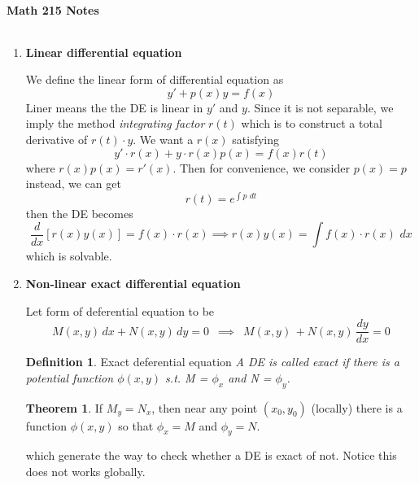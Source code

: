 \documentclass[9pt]{article}
\theoremstyle{definition}
\newtheorem{definition}{Definition}
\newenvironment{changemargin}[2]{%
  \begin{list}{}{%
    \setlength{\topsep}{0pt}%
    \setlength{\leftmargin}{#1}%
    \setlength{\rightmargin}{#2}%
    \setlength{\listparindent}{\parindent}%
    \setlength{\itemindent}{\parindent}%
    \setlength{\parsep}{\parskip}%
  }%
  \item[]}{\end{list}}
\theoremstyle{theorem}
\newtheorem{theorem}{Theorem}
\theoremstyle{remark}
\theoremstyle{lemma}
\begin{document}
\large{\textbf{Math 215 Notes}}


\medskip

\begin{tabular*}{6.5in}{c}
\hline
\end{tabular*}

\bigskip

\begin{changemargin}{-0.125in}{0in}

 \begin{enumerate}
 
	\item \textbf{Linear differential equation}
	
	\medskip
	
	We define the linear form of differential equation as 
	\[
	y' + p(x) y  = f(x)
	\]
    Liner means the the DE is linear in $y'$ and $y$. Since it is not separable, we imply the method \textit{integrating factor} $r(t)$ which is to construct a total derivative of $r(t)\cdot y$. We want a $r(x)$ satisfying 
    \[
    y' \cdot r(x) + y\cdot r(x)p(x) = f(x)r(t)
    \]
    where $r(x)p(x) = r'(x)$. Then for convenience, we consider $p(x) = p$ instead, we can get 
    \[
    r(t) = e^{\int p \,\,dt}
    \]
    then the DE becomes 
    \[
    \frac{d}{dx} [r(x)y(x)] = f(x)\cdot r(x) \implies r(x)y(x) = \int  f(x)\cdot r(x)\,\,dx
    \]
    which is solvable.
    
    \medskip
    
    
     
     \item \textbf{Non-linear exact differential equation}
     
     \medskip
     
     
     Let form of deferential equation to be 
     \[
     M(x,y) \, dx + N(x,y)\, dy = 0 \,\,\,\implies\,\,\, M(x,y)\, + N(x,y)\, \frac{dy}{dx}= 0 
     \]
    \theoremstyle{definition}
    \begin{definition}{Exact deferential equation} \textit{A DE is called \textit{exact} if there is a potential function $\phi(x,y)$ s.t. M = $\phi_x$ and N = $\phi_y$.}
    \end{definition}
    
    \medskip
    
    \theoremstyle{theorem}
    \begin{theorem}
     If $M_y = N_x$, then near any point $(x_0,y_0)$ (locally) there is a function $\phi(x,y)$ so that $\phi_x = M$ and $\phi_y = N$.
    \end{theorem}
     which generate the way to check whether a DE is exact of not. Notice this does not works globally. 
     

\end{enumerate}
\end{changemargin}
\end{document}
